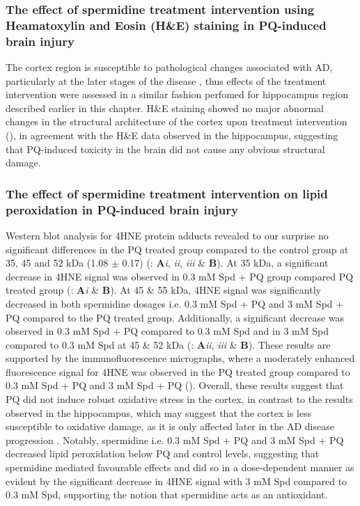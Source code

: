 \subsubsection{The effect of spermidine treatment intervention using Heamatoxylin and Eosin (H\&E) staining in PQ-induced brain injury}
The cortex region is susceptible to pathological changes associated with AD, particularly at the later stages of the disease \citep{Braak1998,Braak1991,Braak2012}, thus effects of the treatment intervention were assessed in a similar fashion perfomed for hippocampus region described earlier in this chapter. H\&E staining showed no major abnormal changes in the structural architecture of the cortex upon treatment intervention (), in agreement with the H\&E data observed in the hippocampus, suggesting that PQ-induced toxicity in the brain did not cause any obvious structural damage. 

\subsubsection{The effect of spermidine treatment intervention on lipid peroxidation in PQ-induced brain injury}
Western blot analysis for 4HNE protein adducts revealed to our surprise no significant differences in the PQ treated group compared to the control group at 35, 45 and 52 kDa (1.08 $\pm$ 0.17) (: \textbf{A}\textit{i}, \textit{ii}, \textit{iii} \& \textbf{B}). At 35 kDa, a significant decrease in 4HNE signal was observed in 0.3 mM Spd + PQ group compared PQ treated group (: \textbf{A}\textit{i} \& \textbf{B}). At 45 \& 55 kDa, 4HNE signal was significantly decreased in both spermidine dosages i.e. 0.3 mM Spd + PQ and 3 mM Spd + PQ compared to the PQ treated group. Additionally, a significant decrease was observed in 0.3 mM Spd + PQ compared to 0.3 mM Spd and in 3 mM Spd compared to 0.3 mM Spd at 45 \& 52 kDa (: \textbf{A}\textit{ii}, \textit{iii} \& \textbf{B}). These results are supported by the immunofluorescence micrographs, where a moderately enhanced fluorescence signal for 4HNE was observed in the PQ treated group compared to 0.3 mM Spd + PQ and 3 mM Spd + PQ (). Overall, these results suggest that PQ did not induce robust oxidative stress in the cortex, in contrast to the results observed in the hippocampus, which may suggest that the cortex is less susceptible to oxidative damage, as it is only affected later in the AD disease progression \citep{lumkwana2017}. Notably, spermidine i.e. 0.3 mM Spd + PQ and 3 mM Spd + PQ decreased lipid peroxidation below PQ and control levels, suggesting that spermidine mediated favourable effects and did so in a dose-dependent manner as evident by the significant decrease in 4HNE signal with 3 mM Spd compared to 0.3 mM Spd, supporting the notion that spermidine acts as an antioxidant.

